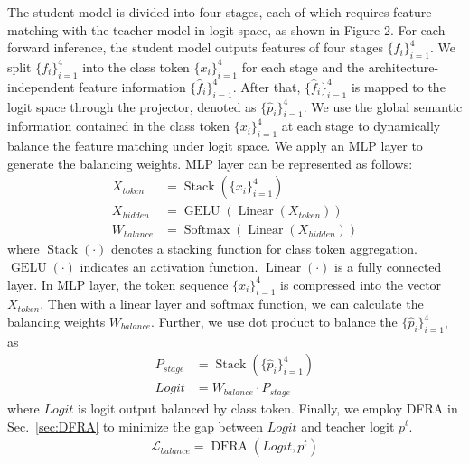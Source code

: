 The student model is divided into four stages, each of which requires feature matching with the teacher model in logit space, as shown in Figure 2. For each forward inference, the student model outputs features of four stages $\{f_{i}\}_{i=1}^{4}$. We split $\{f_{i}\}_{i=1}^{4}$ into the class token $\{x_{i}\}_{i=1}^{4}$ for each stage and the architecture-independent feature information $\{\hat{f}_{i}\}_{i=1}^{4}$. After that, $\{\hat{f}_{i}\}_{i=1}^{4}$ is mapped to the logit space through the projector, denoted as $\{\hat{p}_{i}\}_{i=1}^{4}$. We use the global semantic information contained in the class token $\{x_{i}\}_{i=1}^{4}$ at each stage to dynamically balance the feature matching under logit space. We apply an MLP layer to generate the balancing weights. MLP layer can be represented as follows:
\begin{equation}
    \begin{aligned}
         X_{token} &= \operatorname{Stack}(\{x_{i}\}_{i=1}^{4}) \\
         X_{hidden} &= \operatorname{GELU}(\operatorname{Linear}(X_{token}))   \\
         W_{balance} &= \operatorname{Softmax}(\operatorname{Linear}(X_{hidden}))
    \end{aligned}
\end{equation}
where $\operatorname{Stack}(\cdot)$ denotes a stacking function for class token aggregation. $\operatorname{GELU}(\cdot)$ indicates an activation function. $\operatorname{Linear}(\cdot)$ is a fully connected layer. 
In MLP layer, the token sequence $\{x_{i}\}_{i=1}^{4}$ is compressed into the vector $X_{token}$. Then with a linear layer and softmax function, we can calculate the balancing weights $W_{balance}$. Further, we use dot product to balance the $\{\hat{p}_{i}\}_{i=1}^{4}$, as
\begin{equation}
    \begin{aligned}
        P_{stage} &= \operatorname{Stack}(\{\hat{p}_{i}\}_{i=1}^{4})\\
        Logit &= W_{balance}\cdot P_{stage}
    \end{aligned}
\end{equation}
where $Logit$ is logit output balanced by class token. Finally, we employ DFRA in Sec.~\ref{sec:DFRA} to minimize the gap between $Logit$ and teacher logit $p^{t}$.
\begin{equation}
    \begin{aligned}
        \mathcal{L}_{balance} = \operatorname{DFRA}(Logit, p^{t})
    \end{aligned}
\end{equation}

